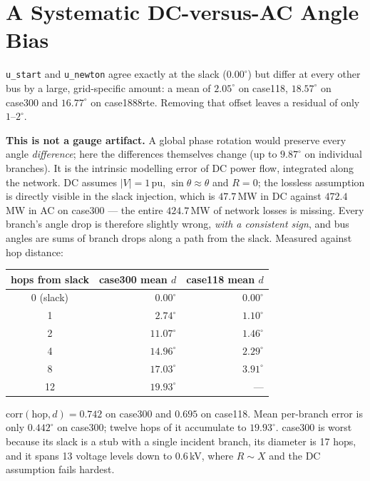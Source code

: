 \documentclass{article}
\newcommand{\pu}{\,\text{pu}}
\begin{document}
\section{A Systematic DC-versus-AC Angle Bias}
\label{sec:dcbias}

\texttt{u\_start} and \texttt{u\_newton} agree exactly at the slack
($0.00^\circ$) but differ at every other bus by a large, grid-specific amount:
a mean of $2.05^\circ$ on case118, $18.57^\circ$ on case300 and $16.77^\circ$ on
case1888rte.  Removing that offset leaves a residual of only $1$--$2^\circ$.

\textbf{This is not a gauge artifact.}  A global phase rotation would preserve
every angle \emph{difference}; here the differences themselves change (up to
$9.87^\circ$ on individual branches).  It is the intrinsic modelling error of DC
power flow, integrated along the network.  DC assumes $|V| = 1\pu$,
$\sin\theta \approx \theta$ and $R = 0$; the lossless assumption is directly
visible in the slack injection, which is $47.7$\,MW in DC against $472.4$\,MW in
AC on case300 --- the entire $424.7$\,MW of network losses is missing.  Every
branch's angle drop is therefore slightly wrong, \emph{with a consistent sign},
and bus angles are sums of branch drops along a path from the slack.  Measured
against hop distance:

\begin{center}
\begin{tabular}{crr}
\toprule
\textbf{hops from slack} & \textbf{case300 mean $d$} & \textbf{case118 mean $d$} \\
\midrule
0 (slack) & $0.00^\circ$  & $0.00^\circ$ \\
1         & $2.74^\circ$  & $1.10^\circ$ \\
2         & $11.07^\circ$ & $1.46^\circ$ \\
4         & $14.96^\circ$ & $2.29^\circ$ \\
8         & $17.03^\circ$ & $3.91^\circ$ \\
12        & $19.93^\circ$ & --- \\
\bottomrule
\end{tabular}
\end{center}

\noindent
$\mathrm{corr}(\text{hop}, d) = 0.742$ on case300 and $0.695$ on case118.  Mean
per-branch error is only $0.442^\circ$ on case300; twelve hops of it accumulate
to $19.93^\circ$.  case300 is worst because its slack is a stub with a single
incident branch, its diameter is 17 hops, and it spans 13 voltage levels down to
$0.6$\,kV, where $R \sim X$ and the DC assumption fails hardest.
\end{document}

